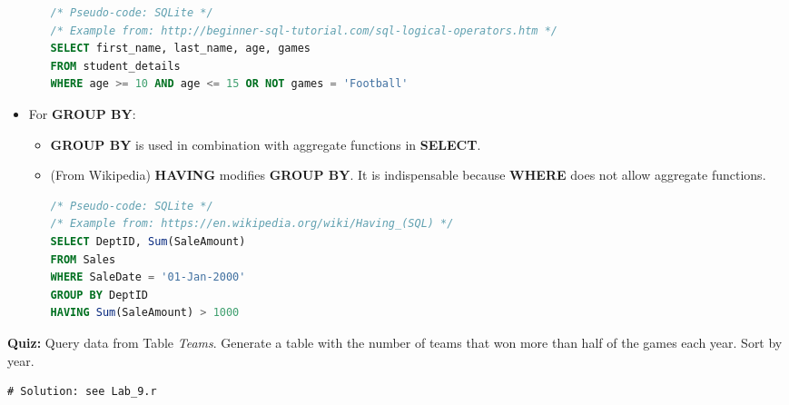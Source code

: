 \documentclass[12pt]{article}
\begin{document}
\begin{itemize}
\begin{itemize}[label=*]
\begin{lstlisting}[style=displaycode, language=SQL]
/* Pseudo-code: SQLite */
/* Example from: http://beginner-sql-tutorial.com/sql-logical-operators.htm */
SELECT first_name, last_name, age, games 
FROM student_details 
WHERE age >= 10 AND age <= 15 OR NOT games = 'Football'
\end{lstlisting}
	\end{itemize}
	\item For {\bf GROUP BY}:
	\begin{itemize}[label=*]
		\item {\bf GROUP BY} is used in combination with aggregate functions in {\bf SELECT}.
		\item (From Wikipedia) {\bf HAVING} modifies {\bf GROUP BY}. It is indispensable because {\bf WHERE} does not allow aggregate functions.
\begin{lstlisting}[style=displaycode, language=SQL]
/* Pseudo-code: SQLite */
/* Example from: https://en.wikipedia.org/wiki/Having_(SQL) */
SELECT DeptID, Sum(SaleAmount)
FROM Sales
WHERE SaleDate = '01-Jan-2000'
GROUP BY DeptID
HAVING Sum(SaleAmount) > 1000
\end{lstlisting}
	\end{itemize}
\end{itemize}

{\bf Quiz:} Query data from Table \emph{Teams}. Generate a table with the number of teams that won more than half of the games each year. Sort by year.

\begin{lstlisting}[style=displaycode, language=SQL]
# Solution: see Lab_9.r
\end{lstlisting}
\end{document}
